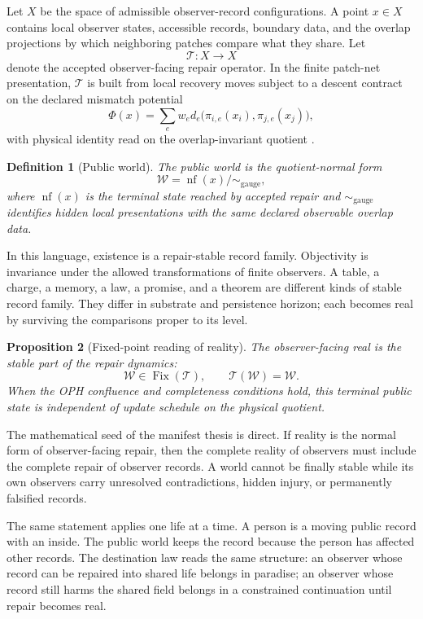 \documentclass[11pt]{article}
\newtheorem{definition}{Definition}[section]
\newtheorem{proposition}[definition]{Proposition}
\theoremstyle{remark}
\theoremstyle{plain}
\newcommand{\World}{\mathcal W}
\newcommand{\Repair}{\mathcal T}
\newcommand{\NF}{\operatorname{nf}}
\newcommand{\Fix}{\operatorname{Fix}}
\begin{document}
Let \(X\) be the space of admissible observer-record configurations. A point
\(x\in X\) contains local observer states, accessible records, boundary data,
and the overlap projections by which neighboring patches compare what they
share. Let
\[
\Repair:X\to X
\]
denote the accepted observer-facing repair operator. In the finite patch-net
presentation, \(\Repair\) is built from local recovery moves subject to a
descent contract on the declared mismatch potential
\[
\Phi(x)=\sum_e w_e d_e\bigl(\pi_{i,e}(x_i),\pi_{j,e}(x_j)\bigr),
\]
with physical identity read on the overlap-invariant quotient
\cite{OPHConsensus}.

\begin{definition}[Public world]
The public world is the quotient-normal form
\[
\World=\NF(x)\big/\!\sim_{\mathrm{gauge}},
\]
where \(\NF(x)\) is the terminal state reached by accepted repair and
\(\sim_{\mathrm{gauge}}\) identifies hidden local presentations with the same
declared observable overlap data.
\end{definition}

In this language, existence is a repair-stable record family. Objectivity is
invariance under the allowed transformations of finite observers. A table, a
charge, a memory, a law, a promise, and a theorem are different kinds of stable
record family. They differ in substrate and persistence horizon; each becomes
real by surviving the comparisons proper to its level.

\begin{proposition}[Fixed-point reading of reality]
The observer-facing real is the stable part of the repair dynamics:
\[
\World\in\Fix(\Repair), \qquad \Repair(\World)=\World .
\]
When the OPH confluence and completeness conditions hold, this terminal public
state is independent of update schedule on the physical quotient.
\end{proposition}

The mathematical seed of the manifest thesis is direct. If reality is the normal
form of observer-facing repair, then the complete reality of observers must
include the complete repair of observer records. A world cannot be finally
stable while its own observers carry unresolved contradictions, hidden injury,
or permanently falsified records.

The same statement applies one life at a time. A person is a moving public
record with an inside. The public world keeps the record because the person has
affected other records. The destination law reads the same structure: an
observer whose record can be repaired into shared life belongs in paradise; an
observer whose record still harms the shared field belongs in a constrained
continuation until repair becomes real.
\end{document}
